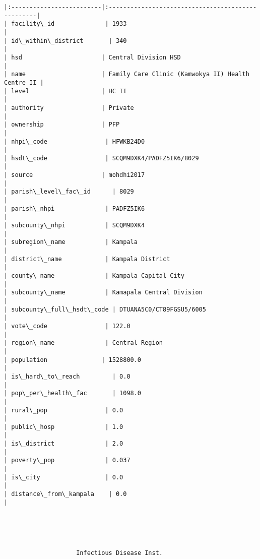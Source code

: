\documentclass[11pt]{article}
\begin{document}
\begin{Verbatim}[commandchars=\\\{\}]
|:-------------------------|:--------------------------------------------------|
| facility\_id              | 1933                                              |
| id\_within\_district       | 340                                               |
| hsd                      | Central Division HSD                              |
| name                     | Family Care Clinic (Kamwokya II) Health Centre II |
| level                    | HC II                                             |
| authority                | Private                                           |
| ownership                | PFP                                               |
| nhpi\_code                | HFWKB24D0                                         |
| hsdt\_code                | SCQM9DXK4/PADFZ5IK6/8029                          |
| source                   | mohdhi2017                                        |
| parish\_level\_fac\_id      | 8029                                              |
| parish\_nhpi              | PADFZ5IK6                                         |
| subcounty\_nhpi           | SCQM9DXK4                                         |
| subregion\_name           | Kampala                                           |
| district\_name            | Kampala District                                  |
| county\_name              | Kampala Capital City                              |
| subcounty\_name           | Kamapala Central Division                         |
| subcounty\_full\_hsdt\_code | DTUANA5C0/CT89FGSU5/6005                          |
| vote\_code                | 122.0                                             |
| region\_name              | Central Region                                    |
| population               | 1528800.0                                         |
| is\_hard\_to\_reach         | 0.0                                               |
| pop\_per\_health\_fac       | 1098.0                                            |
| rural\_pop                | 0.0                                               |
| public\_hosp              | 1.0                                               |
| is\_district              | 2.0                                               |
| poverty\_pop              | 0.037                                             |
| is\_city                  | 0.0                                               |
| distance\_from\_kampala    | 0.0                                               |





                    Infectious Disease Inst.                    


\end{Verbatim}
\end{document}
